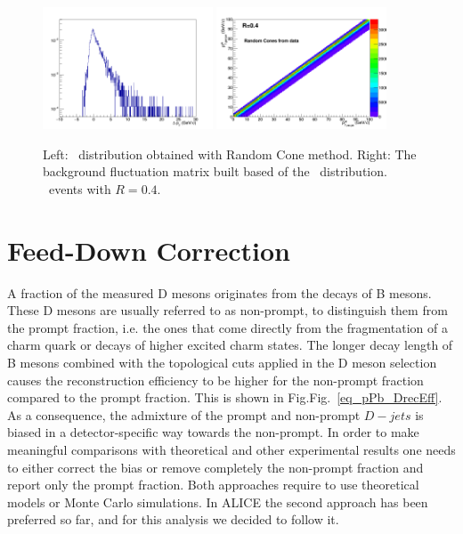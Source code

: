 \begin{figure}[bth]
\centering
\includegraphics[width=0.45\textwidth]{pPbplots/ResponseMatrix/DeltaPt}
\includegraphics[width=0.45\textwidth]{pPbplots/ResponseMatrix/BkgMatrix}
\caption{Left: \deltapt\ distribution obtained with Random Cone method. Right: The background fluctuation matrix built based of the \deltapt\ distribution. \pPb\ events with $R=0.4$.}
\label{fDeltaPt}
\end{figure}


\section{Feed-Down Correction}
\label{sect:FD}

A fraction of the measured D mesons originates from the decays of B mesons. These D mesons are usually referred to as non-prompt,
to distinguish them from the prompt fraction, i.e. the ones that come directly from the fragmentation of a charm quark or decays of higher excited charm states.
The longer decay length of B mesons combined with the topological cuts applied in the D meson selection causes the reconstruction efficiency 
to be higher for the non-prompt fraction compared to the prompt fraction. This is shown in Fig.Fig.~\ref{eq_pPb_DrecEff}.
As a consequence, the admixture of the prompt and non-prompt $D-jets$ is biased in a detector-specific way towards the non-prompt.
In order to make meaningful comparisons with theoretical and other experimental results one needs to either correct the bias or remove completely the non-prompt fraction and report only the prompt fraction. Both approaches require to use theoretical models or Monte Carlo simulations.
In ALICE the second approach has been preferred so far, and for this analysis we decided to follow it.

